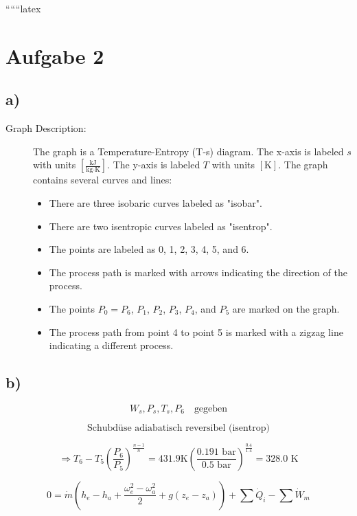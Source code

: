 
``````latex


\section*{Aufgabe 2}

\subsection*{a)}

\begin{description}
    \item[Graph Description:] The graph is a Temperature-Entropy (T-s) diagram. The x-axis is labeled \( s \) with units \([ \frac{\text{kJ}}{\text{kg} \cdot \text{K}} ]\). The y-axis is labeled \( T \) with units \([ \text{K} ]\). The graph contains several curves and lines:
    \begin{itemize}
        \item There are three isobaric curves labeled as "isobar".
        \item There are two isentropic curves labeled as "isentrop".
        \item The points are labeled as 0, 1, 2, 3, 4, 5, and 6.
        \item The process path is marked with arrows indicating the direction of the process.
        \item The points \( P_0 = P_6 \), \( P_1 \), \( P_2 \), \( P_3 \), \( P_4 \), and \( P_5 \) are marked on the graph.
        \item The process path from point 4 to point 5 is marked with a zigzag line indicating a different process.
    \end{itemize}
\end{description}

\subsection*{b)}

\[
W_s, P_s, T_s, P_6 \quad \text{gegeben}
\]

\[
\text{Schubdüse adiabatisch reversibel (isentrop)}
\]

\[
\Rightarrow T_6 - T_5 \left( \frac{P_6}{P_5} \right)^{\frac{n-1}{n}} = 431.9 \text{K} \left( \frac{0.191 \text{ bar}}{0.5 \text{ bar}} \right)^{\frac{0.4}{1.4}} = 328.0 \text{ K}
\]

\[
0 = \dot{m} \left( h_e - h_a + \frac{\omega_e^2 - \omega_a^2}{2} + g (z_e - z_a) \right) + \sum \dot{Q}_i - \sum \dot{W}_m
\]


